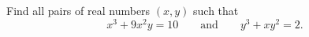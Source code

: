 Find all pairs of real numbers $(x,y)$ such that
\[x^3+9x^2y=10\qquad\text{and}\qquad y^3+xy^2=2.\]
